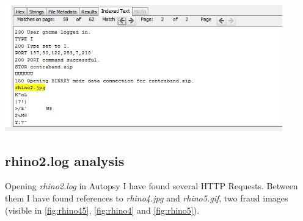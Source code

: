 \documentclass{article}
\begin{document}
\begin{minipage}[h]{0.45\textwidth}
	\centering
	\vspace{0.5cm}
	\includegraphics[width=0.9\textwidth]{img/rhino2inrhinolog.png}
	\vspace{1cm}
	\label{fig:rhino2}
\end{minipage}

\subsection{rhino2.log analysis}
Opening \textit{rhino2.log} in Autopsy I have found several HTTP Requests.
Between them I have found references to \textit{rhino4.jpg} and \textit{rhino5.gif}, two fraud images (visible in \autoref{fig:rhino45}, \autoref{fig:rhino4} and \autoref{fig:rhino5}).
\end{document}
